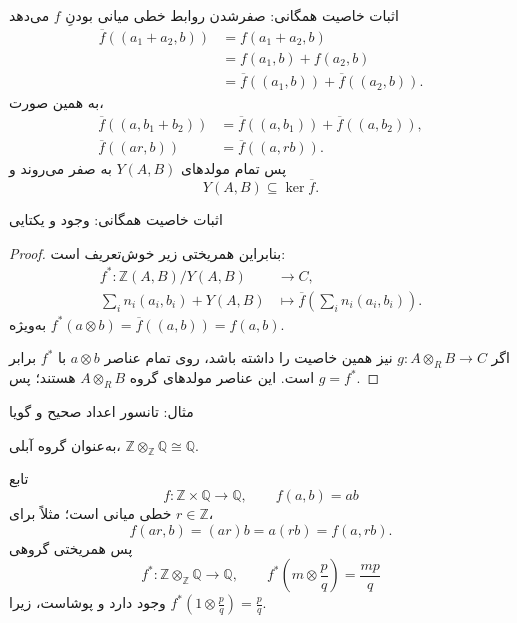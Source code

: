 \begin{frame}[t]{اثبات خاصیت همگانی: صفرشدن روابط}
    \label{lec19:universal-relations}
    خطی میانی بودنِ $f$ می‌دهد
    \[
    \begin{aligned}
        \overline f((a_1+a_2,b))
        &=f(a_1+a_2,b)\\
        &=f(a_1,b)+f(a_2,b)\\
        &=\overline f((a_1,b))+\overline f((a_2,b)).
    \end{aligned}
    \]
    به همین صورت،
    \[
    \begin{aligned}
        \overline f((a,b_1+b_2))&=\overline f((a,b_1))+\overline f((a,b_2)),\\
        \overline f((ar,b))&=\overline f((a,rb)).
    \end{aligned}
    \]
    پس تمام مولدهای $Y(A,B)$ به صفر می‌روند و
    \[
        Y(A,B)\subseteq\ker\overline f.
    \]
\end{frame}

\begin{frame}[t]{اثبات خاصیت همگانی: وجود و یکتایی}
    \label{lec19:universal-quotient-uniqueness}
    \begin{proof}
    بنابراین همریختی زیر خوش‌تعریف است:
    \[
    \begin{aligned}
        f^*: \mathbb Z(A,B)/Y(A,B)&\longrightarrow C,\\
        \sum_i n_i(a_i,b_i)+Y(A,B)
            &\longmapsto\overline f\left(\sum_i n_i(a_i,b_i)\right).
    \end{aligned}
    \]
    به‌ویژه $f^*(a\otimes b)=\overline f((a,b))=f(a,b)$.

    اگر $g:A\otimes_R B\longrightarrow C$ نیز همین خاصیت را داشته باشد،
    روی تمام عناصر $a\otimes b$ با $f^*$ برابر است.
    این عناصر مولدهای گروه $A\otimes_R B$ هستند؛ پس $g=f^*$.
    \end{proof}
\end{frame}

\begin{frame}[t]{مثال: تانسور اعداد صحیح و گویا}
    \label{lec19:z-tensor-q-map}
    \begin{example}
        به‌عنوان گروه آبلی، $\mathbb Z\otimes_{\mathbb Z}\mathbb Q\cong\mathbb Q$.
    \end{example}
    تابع
    \[
        f:\mathbb Z\times\mathbb Q\longrightarrow\mathbb Q,
        \qquad f(a,b)=ab
    \]
    خطی میانی است؛ مثلاً برای $r\in\mathbb Z$،
    \[
        f(ar,b)=(ar)b=a(rb)=f(a,rb).
    \]
    پس همریختی گروهی
    \[
        f^*:\mathbb Z\otimes_{\mathbb Z}\mathbb Q\longrightarrow\mathbb Q,
        \qquad f^*\left(m\otimes\frac pq\right)=\frac{mp}{q}
    \]
    وجود دارد و پوشاست، زیرا $f^*(1\otimes\frac pq)=\frac pq$.
\end{frame}

